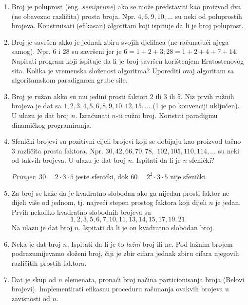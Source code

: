  \begin{enumerate}
 	\item Broj je poluprost (eng. \textit{semiprime}) ako se može predstaviti
 	kao proizvod dva (ne obavezno različita) prosta broja. Npr. $4, 6, 9, 10, \ldots$ su neki od poluprostih brojeva. Konstruisati (efikasan) algoritam koji ispituje da li je broj poluprost.
 	\item Broj je savršen akko je jednak zbiru svojih djelilaca (ne računajući njega samog). Npr. 6 i 28 su savršeni jer je $6 = 1 + 2 + 3; 28 = 1 + 2 + 4 + 7 + 14$. Napisati program koji ispituje da li je broj savršen korištenjem Eratostenovog sita. Kolika je vremenska složenost algoritma? Uporediti ovaj algoritam sa algoritamskom paradigmom grube sile.
 	\item Broj je ružan akko su mu jedini prosti faktori 2 ili 3 ili 5. Niz prvih ružnih brojeva je dat sa $1, 2, 3, 4, 5, 6, 8, 9, 10, 12, 15, \ldots$ (1 je po
 	konvenciji uključen). U ulazu je  dat broj $n$. Izračunati $n$-ti ružni broj. Koristiti paradigmu dinamičkog programiranja.
 	\item Sfenički brojevi su pozitivni cijeli brojevi koji se dobijaju kao proizvod tačno 3 različita prosta faktora. Npr. $30, 42, 66, 70, 78,$ $102, 105, 110, 114, \ldots$ su neki od takvih brojeva. U ulazu je dat broj $n$. Ispitati da li je $n$ sfenički? 
 	
 	\textit{Primjer}. $30=2 \cdot 3 \cdot 5$ jeste sfenički, dok $60 = 2^2 \cdot 3 \cdot 5 $ nije sfenički. 
 	\item Za broj se kaže da je kvadratno slobodan ako ga nijedan
 	prosti faktor ne dijeli više od jednom, tj. najveći stepen prostog
 	faktora koji dijeli $n$  je jedan.  Prvih nekoliko kvadratno slobodnih brojeva su $$1, 2, 3, 5, 6, 7,
 	10, 11, 13, 14, 15, 17, 19, 21.$$   Na ulazu je dat broj $n$. Ispitati da li je on kvadratno slobodan broj.
 	\item Neka je dat broj $n$. Ispitati da li je to \textit{lažni} broj ili ne.
 	Pod lažnim brojem podrazumijevamo složeni broj, čiji je zbir cifara jednak zbiru cifara njegovih različitih prostih faktora.%
 	
 	\item Dat je skup od $n$ elemenata, pronaći broj načina particionisanja broja (Belovi brojevi). Implementirati efikasnu proceduru računanja ovakvih brojeva u zavisnosti od $n$.  %
 \end{enumerate}